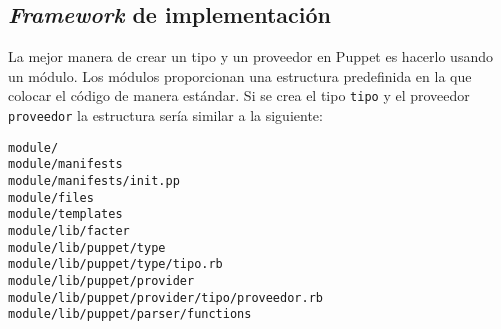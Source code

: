 \subsection{\emph{Framework} de implementación}
\label{sec:modelado-framework}





La mejor manera de crear un tipo y un proveedor en Puppet es hacerlo usando un módulo. Los módulos proporcionan una estructura predefinida en la que colocar el código de manera estándar. Si se crea el tipo \texttt{tipo} y el proveedor \texttt{proveedor} la estructura sería similar a la siguiente:

\begin{lstlisting}
module/
module/manifests
module/manifests/init.pp
module/files
module/templates
module/lib/facter
module/lib/puppet/type
module/lib/puppet/type/tipo.rb
module/lib/puppet/provider
module/lib/puppet/provider/tipo/proveedor.rb
module/lib/puppet/parser/functions
\end{lstlisting}

